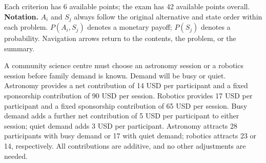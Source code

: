 Each criterion has 6 available points; the exam has 42 available points overall.
\textbf{Notation.} $A_i$ and $S_j$ always follow the original alternative and state order within each problem. $P(A_i,S_j)$ denotes a monetary payoff; $P(S_j)$ denotes a probability. Navigation arrows return to the contents, the problem, or the summary.
\endgroup

\clearpage
{}
A community science centre must choose an astronomy session or a robotics session before family demand is known. Demand will be busy or quiet. Astronomy provides a net contribution of 14 USD per participant and a fixed sponsorship contribution of 90 USD per session. Robotics provides 17 USD per participant and a fixed sponsorship contribution of 65 USD per session. Busy demand adds a further net contribution of 5 USD per participant to either session; quiet demand adds 3 USD per participant. Astronomy attracts 28 participants with busy demand or 17 with quiet demand; robotics attracts 23 or 14, respectively. All contributions are additive, and no other adjustments are needed.
